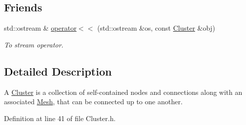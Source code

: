 \subsection*{\-Friends}
\begin{DoxyCompactItemize}
\item 
std\-::ostream \& \hyperlink{classcryomesh_1_1structures_1_1Cluster_adb5b48a591cc8d6f293b915068597a8a}{operator$<$$<$} (std\-::ostream \&os, const \hyperlink{classcryomesh_1_1structures_1_1Cluster}{\-Cluster} \&obj)
\begin{DoxyCompactList}\small\item\em \-To stream operator. \end{DoxyCompactList}\end{DoxyCompactItemize}


\subsection{\-Detailed \-Description}
\-A \hyperlink{classcryomesh_1_1structures_1_1Cluster}{\-Cluster} is a collection of self-\/contained nodes and connections along with an associated \hyperlink{classcryomesh_1_1structures_1_1Mesh}{\-Mesh}, that can be connected up to one another. 

\-Definition at line 41 of file \-Cluster.\-h.



